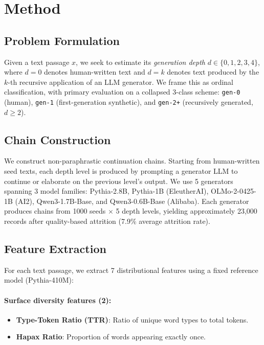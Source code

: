 \documentclass[11pt,a4paper]{article}
\begin{document}
\section{Method}

\subsection{Problem Formulation}

Given a text passage $x$, we seek to estimate its \emph{generation depth} $d \in \{0, 1, 2, 3, 4\}$, where $d{=}0$ denotes human-written text and $d{=}k$ denotes text produced by the $k$-th recursive application of an LLM generator. We frame this as ordinal classification, with primary evaluation on a collapsed 3-class scheme: \texttt{gen-0} (human), \texttt{gen-1} (first-generation synthetic), and \texttt{gen-2+} (recursively generated, $d{\geq}2$).

\subsection{Chain Construction}

We construct non-paraphrastic continuation chains. Starting from human-written seed texts, each depth level is produced by prompting a generator LLM to continue or elaborate on the previous level's output. We use 5 generators spanning 3 model families: Pythia-2.8B, Pythia-1B (EleutherAI), OLMo-2-0425-1B (AI2), Qwen3-1.7B-Base, and Qwen3-0.6B-Base (Alibaba). Each generator produces chains from 1000 seeds $\times$ 5 depth levels, yielding approximately 23,000 records after quality-based attrition (7.9\% average attrition rate).

\subsection{Feature Extraction}

For each text passage, we extract 7 distributional features using a fixed reference model (Pythia-410M):

\paragraph{Surface diversity features (2):}
\begin{itemize}
    \item \textbf{Type-Token Ratio (TTR)}: Ratio of unique word types to total tokens.
    \item \textbf{Hapax Ratio}: Proportion of words appearing exactly once.
\end{itemize}
\end{document}
